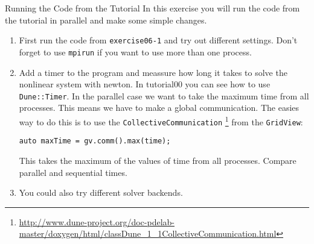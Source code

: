 \documentclass[12pt,a4paper]{article}
\begin{document}
\begin{Exercise}{Running the Code from the Tutorial}
  In this exercise you will run the code from the tutorial in parallel
  and make some simple changes.
  \begin{enumerate}
  \item First run the code from \lstinline{exercise06-1} and try out
    different settings. Don't forget to use \lstinline{mpirun} if you
    want to use more than one process.
  \item Add a timer to the program and meassure how long it takes to
    solve the nonlinear system with newton. In tutorial00 you can see
    how to use \lstinline{Dune::Timer}. In the parallel case we want
    to take the maximum time from all processes. This means we have to
    make a global communication. The easies way to do this is to use
    the \lstinline{CollectiveCommunication}
    \footnote{\href{http://www.dune-project.org/doc-pdelab-master/doxygen/html/classDune\_1\_1CollectiveCommunication.html}{http://www.dune-project.org/doc-pdelab-master/doxygen/html/classDune\_1\_1CollectiveCommunication.html}}
    from the \lstinline{GridView}:
    \begin{lstlisting}
auto maxTime = gv.comm().max(time);
    \end{lstlisting}
    This takes the maximum of the values of time from all
    processes. Compare parallel and sequential times.
  \item You could also try different solver backends.
  \end{enumerate}
\end{Exercise}
\end{document}
